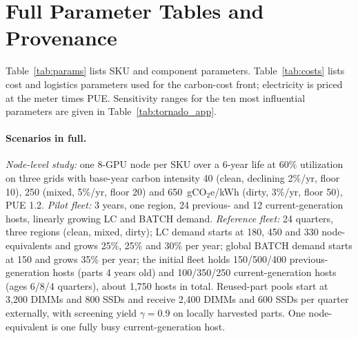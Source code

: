 \documentclass{article} %
\begin{document}
\section{Full Parameter Tables and Provenance}
\label{app:params}
Table~\ref{tab:params} lists SKU and component parameters. Table~\ref{tab:costs} lists cost and logistics parameters used for the carbon-cost front; electricity is priced at the meter times PUE. Sensitivity ranges for the ten most influential parameters are given in Table~\ref{tab:tornado_app}.

\begin{table}[h]
\caption{Cost and logistics parameters (engineering assumptions).}
\label{tab:costs}
\begin{center}
\small
{}
\end{center}
\end{table}

\paragraph{Scenarios in full.} \emph{Node-level study:} one 8-GPU node per SKU over a 6-year life at 60\% utilization on three grids with base-year carbon intensity 40 (clean, declining 2\%/yr, floor 10), 250 (mixed, 5\%/yr, floor 20) and 650~gCO$_2$e/kWh (dirty, 3\%/yr, floor 50), PUE 1.2. \emph{Pilot fleet:} 3 years, one region, 24 previous- and 12 current-generation hosts, linearly growing LC and BATCH demand. \emph{Reference fleet:} 24 quarters, three regions (clean, mixed, dirty); LC demand starts at 180, 450 and 330 node-equivalents and grows 25\%, 25\% and 30\% per year; global BATCH demand starts at 150 and grows 35\% per year; the initial fleet holds 150/500/400 previous-generation hosts (parts 4 years old) and 100/350/250 current-generation hosts (ages 6/8/4 quarters), about 1,750 hosts in total. Reused-part pools start at 3,200 DIMMs and 800 SSDs and receive 2,400 DIMMs and 600 SSDs per quarter externally, with screening yield $\gamma = 0.9$ on locally harvested parts. One node-equivalent is one fully busy current-generation host.
\end{document}
